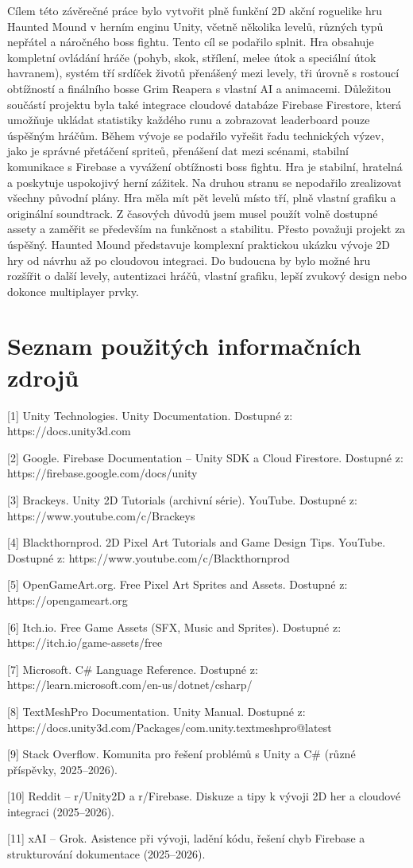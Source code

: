 \documentclass[12pt,a4paper]{article}
\begin{document}
Cílem této závěrečné práce bylo vytvořit plně funkční 2D akční roguelike hru Haunted Mound v herním enginu Unity, včetně několika levelů, různých typů nepřátel a náročného boss fightu.
Tento cíl se podařilo splnit. Hra obsahuje kompletní ovládání hráče (pohyb, skok, střílení, melee útok a speciální útok havranem), systém tří srdíček životů přenášený mezi levely, tři úrovně s rostoucí obtížností a finálního bosse Grim Reapera s vlastní AI a animacemi. Důležitou součástí projektu byla také integrace cloudové databáze Firebase Firestore, která umožňuje ukládat statistiky každého runu a zobrazovat leaderboard pouze úspěšným hráčům.
Během vývoje se podařilo vyřešit řadu technických výzev, jako je správné přetáčení spriteů, přenášení dat mezi scénami, stabilní komunikace s Firebase a vyvážení obtížnosti boss fightu. Hra je stabilní, hratelná a poskytuje uspokojivý herní zážitek.
Na druhou stranu se nepodařilo zrealizovat všechny původní plány. Hra měla mít pět levelů místo tří, plně vlastní grafiku a originální soundtrack. Z časových důvodů jsem musel použít volně dostupné assety a zaměřit se především na funkčnost a stabilitu.
Přesto považuji projekt za úspěšný. Haunted Mound představuje komplexní praktickou ukázku vývoje 2D hry od návrhu až po cloudovou integraci. Do budoucna by bylo možné hru rozšířit o další levely, autentizaci hráčů, vlastní grafiku, lepší zvukový design nebo dokonce multiplayer prvky.
	
	\newpage
	
\section{Seznam použitých informačních zdrojů}

[1] Unity Technologies. Unity Documentation. Dostupné z: https://docs.unity3d.com

[2] Google. Firebase Documentation – Unity SDK a Cloud Firestore. Dostupné z: https://firebase.google.com/docs/unity

[3] Brackeys. Unity 2D Tutorials (archivní série). YouTube. Dostupné z: https://www.youtube.com/c/Brackeys

[4] Blackthornprod. 2D Pixel Art Tutorials and Game Design Tips. YouTube. Dostupné z: https://www.youtube.com/c/Blackthornprod

[5] OpenGameArt.org. Free Pixel Art Sprites and Assets. Dostupné z: https://opengameart.org

[6] Itch.io. Free Game Assets (SFX, Music and Sprites). Dostupné z: https://itch.io/game-assets/free

[7] Microsoft. C\# Language Reference. Dostupné z: https://learn.microsoft.com/en-us/dotnet/csharp/

[8] TextMeshPro Documentation. Unity Manual. Dostupné z: https://docs.unity3d.com/Packages/com.unity.textmeshpro@latest

[9] Stack Overflow. Komunita pro řešení problémů s Unity a C\# (různé příspěvky, 2025--2026).

[10] Reddit – r/Unity2D a r/Firebase. Diskuze a tipy k vývoji 2D her a cloudové integraci (2025--2026).

[11] xAI – Grok. Asistence při vývoji, ladění kódu, řešení chyb Firebase a strukturování dokumentace (2025--2026).
\end{document}

